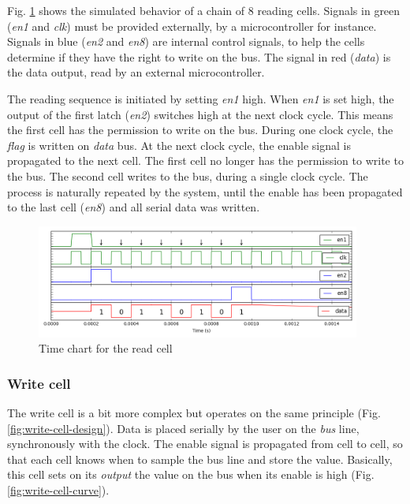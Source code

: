 Fig. \ref{fig:read-cell-curve} shows the simulated behavior of a chain of 8 reading cells.
Signals in green (\textit{en1} and \textit{clk}) must be provided externally, by a microcontroller for instance.
Signals in blue (\textit{en2} and \textit{en8}) are internal control signals, to help the cells determine if they have the right to write on the bus.
The signal in red (\textit{data}) is the data output, read by an external microcontroller.

The reading sequence is initiated by setting \textit{en1} high.
When \textit{en1} is set high, the output of the first latch (\textit{en2}) switches high at the next clock cycle.
This means the first cell has the permission to write on the bus.
During one clock cycle, the \textit{flag} is written on \textit{data} bus.
At the next clock cycle, the enable signal is propagated to the next cell.
The first cell no longer has the permission to write to the bus.
The second cell writes to the bus, during a single clock cycle.
The process is naturally repeated by the system, until the enable has been propagated to the last cell (\textit{en8}) and all serial data was written.

\begin{figure}[!h]
  \centering
  \includegraphics[width=0.95\textwidth]{src/3/figures/curve_read_cell.png}
  \caption{Time chart for the read cell}
  \label{fig:read-cell-curve}
\end{figure}

\subsubsection{Write cell}

The write cell is a bit more complex but operates on the same principle (Fig. \ref{fig:write-cell-design}).
Data is placed serially by the user on the \textit{bus} line, synchronously with the clock.
The enable signal is propagated from cell to cell, so that each cell knows when to sample the bus line and store the value.
Basically, this cell sets on its \textit{output} the value on the bus when its enable is high (Fig. \ref{fig:write-cell-curve}).

